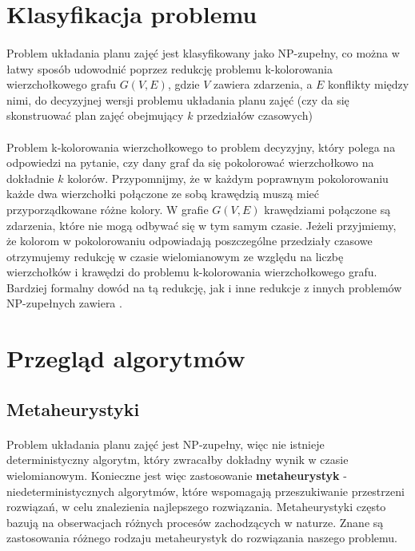 \section{Klasyfikacja problemu}
\paragraph{}Problem układania planu zajęć jest klasyfikowany jako NP-zupełny, co można w łatwy sposób udowodnić poprzez redukcję problemu k-kolorowania wierzchołkowego grafu $G(V, E)$, gdzie $V$ zawiera zdarzenia, a $E$ konflikty między nimi, do decyzyjnej wersji problemu układania planu zajęć (czy da się skonstruować plan zajęć obejmujący $k$ przedziałów czasowych) 
\paragraph{}Problem k-kolorowania wierzchołkowego to problem decyzyjny, który polega na odpowiedzi na pytanie, czy dany graf da się pokolorować wierzchołkowo na dokładnie $k$ kolorów. Przypomnijmy, że w każdym poprawnym pokolorowaniu każde dwa wierzchołki połączone ze sobą krawędzią muszą mieć przyporządkowane różne kolory. W grafie $G(V,E)$ krawędziami połączone są zdarzenia, które nie mogą odbywać się w tym samym czasie. Jeżeli przyjmiemy, że kolorom w pokolorowaniu odpowiadają poszczególne przedziały czasowe otrzymujemy redukcję w czasie wielomianowym ze względu na liczbę wierzchołków i krawędzi do problemu k-kolorowania wierzchołkowego grafu. Bardziej formalny dowód na tą redukcję, jak i inne redukcje z innych problemów NP-zupełnych zawiera \cite{npcomplete}.


\section{Przegląd algorytmów}
\subsection{Metaheurystyki}
\paragraph{}Problem układania planu zajęć jest NP-zupełny, więc nie istnieje deterministyczny algorytm, który zwracałby dokładny wynik w czasie wielomianowym. Konieczne jest więc zastosowanie \textbf{metaheurystyk} - niedeterministycznych algorytmów, które wspomagają przeszukiwanie przestrzeni rozwiązań, w celu znalezienia najlepszego rozwiązania. Metaheurystyki często bazują na obserwacjach różnych procesów zachodzących w naturze. Znane są zastosowania różnego rodzaju metaheurystyk do rozwiązania naszego problemu.

